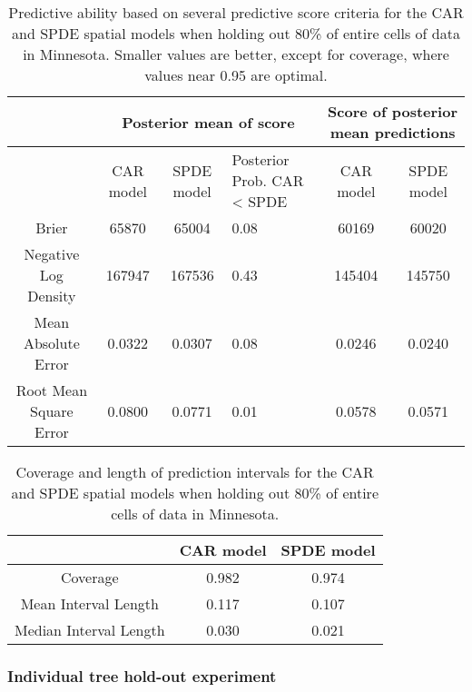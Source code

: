 \documentclass[12pt]{article}\usepackage[]{graphicx}\usepackage[]{color}
\providecommand{\tabularnewline}{\\}
\begin{document}
\begin{table}
\caption{Predictive ability based on several predictive score criteria for
the CAR and SPDE spatial models when holding out 80\% of entire cells
of data in Minnesota. Smaller values are better, except for coverage,
where values near 0.95 are optimal.}


\begin{tabular}{|c|c|c|>{\centering}p{3cm}|c|c|}
\hline 
 &
\multicolumn{3}{c|}{{\small{Posterior mean of score}}} &
\multicolumn{2}{c|}{{\small{Score of posterior mean predictions}}}\tabularnewline
\hline 
\hline 
 &
{\small{CAR model}} &
{\small{SPDE model}} &
{\small{Posterior Prob. CAR < SPDE}} &
{\small{CAR model}} &
{\small{SPDE model}}\tabularnewline
\hline 
{\small{Brier}} &
{\small{65870}} &
{\small{65004}} &
{\small{0.08}} &
{\small{60169}} &
{\small{60020}}\tabularnewline
\hline 
{\small{Negative Log Density}} &
{\small{167947}} &
{\small{167536}} &
{\small{0.43}} &
{\small{145404}} &
{\small{145750}}\tabularnewline
\hline 
{\small{Mean Absolute Error}} &
{\small{0.0322}} &
{\small{0.0307}} &
{\small{0.08}} &
{\small{0.0246}} &
{\small{0.0240}}\tabularnewline
\hline 
{\small{Root Mean Square Error}} &
{\small{0.0800}} &
{\small{0.0771}} &
{\small{0.01}} &
{\small{0.0578}} &
{\small{0.0571}}\tabularnewline
\hline 
\end{tabular}

\label{tab:score_cell_20percent}
\end{table}


\begin{table}
\caption{Coverage and length of prediction intervals for the CAR and SPDE spatial
models when holding out 80\% of entire cells of data in Minnesota. }


\begin{tabular}{|c|c|c|}
\hline 
 &
{\small{CAR model}} &
{\small{SPDE model}}\tabularnewline
\hline 
{\small{Coverage}} &
{\small{0.982}} &
{\small{0.974}}\tabularnewline
\hline 
{\small{Mean Interval Length}} &
{\small{0.117}} &
{\small{0.107}}\tabularnewline
\hline 
{\small{Median Interval Length}} &
{\small{0.030}} &
{\small{0.021}}\tabularnewline
\hline 
\end{tabular}

\label{tab:coverage_cell_20percent}
\end{table}



\subsubsection{Individual tree hold-out experiment}
\end{document}
